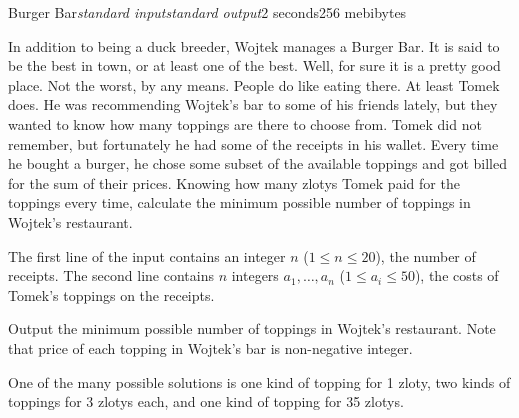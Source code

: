 \begin{problem}{Burger Bar}{\textsl{standard input}}{\textsl{standard output}}{2 seconds}{256 mebibytes}{}

In addition to being a duck breeder, Wojtek manages a Burger Bar.
It is said to be the best in town, or at least one of the best.
Well, for sure it is a pretty good place.
Not the worst, by any means.
People do like eating there.
At least Tomek does.
He was recommending Wojtek's bar to some of his friends lately, but they wanted to know how many toppings are there to choose from.
Tomek did not remember, but fortunately he had some of the receipts in his wallet.
Every time he bought a burger, he chose some subset of the available toppings and got billed for the sum of their prices.
Knowing how many zlotys Tomek paid for the toppings every time, calculate the minimum possible number of toppings in Wojtek's restaurant.


\InputFile
    The first line of the input contains an integer $n$ ($1 \leq n \leq 20$), the number of receipts.
	 The second line contains $n$ integers $a_1, \ldots, a_n$ ($1 \leq a_i \leq 50$), the costs of Tomek's toppings on the receipts.

\OutputFile
	Output the minimum possible number of toppings in Wojtek's restaurant. Note that price of each topping in Wojtek's bar is non-negative integer.

\Examples
\begin{example}
%
\end{example}

\Note

One of the many possible solutions is one kind of topping for 1 zloty, two kinds of toppings for 3 zlotys each, and one kind of topping for 35 zlotys.

\end{problem}
